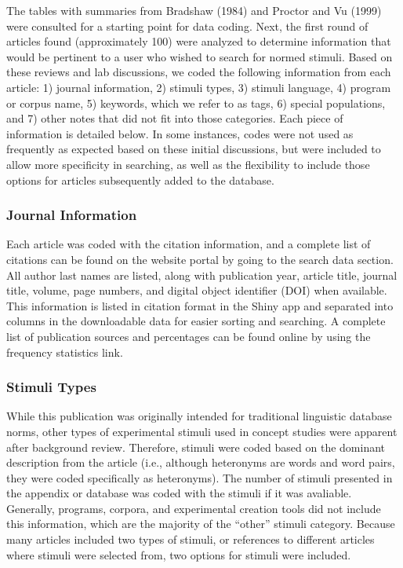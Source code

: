 \documentclass[english,,man]{apa6}
\theoremstyle{definition}
\theoremstyle{definition}
\theoremstyle{definition}
\theoremstyle{remark}
\begin{document}
The tables with summaries from Bradshaw (1984) and Proctor and Vu (1999)
were consulted for a starting point for data coding. Next, the first
round of articles found (approximately 100) were analyzed to determine
information that would be pertinent to a user who wished to search for
normed stimuli. Based on these reviews and lab discussions, we coded the
following information from each article: 1) journal information, 2)
stimuli types, 3) stimuli language, 4) program or corpus name, 5)
keywords, which we refer to as tags, 6) special populations, and 7)
other notes that did not fit into those categories. Each piece of
information is detailed below. In some instances, codes were not used as
frequently as expected based on these initial discussions, but were
included to allow more specificity in searching, as well as the
flexibility to include those options for articles subsequently added to
the database.

\hypertarget{journal-information}{%
\subsubsection{Journal Information}\label{journal-information}}

Each article was coded with the citation information, and a complete
list of citations can be found on the website portal by going to the
search data section. All author last names are listed, along with
publication year, article title, journal title, volume, page numbers,
and digital object identifier (DOI) when available. This information is
listed in citation format in the Shiny app and separated into columns in
the downloadable data for easier sorting and searching. A complete list
of publication sources and percentages can be found online by using the
frequency statistics link.

\hypertarget{stimuli-types}{%
\subsubsection{Stimuli Types}\label{stimuli-types}}

While this publication was originally intended for traditional
linguistic database norms, other types of experimental stimuli used in
concept studies were apparent after background review. Therefore,
stimuli were coded based on the dominant description from the article
(i.e., although heteronyms are words and word pairs, they were coded
specifically as heteronyms). The number of stimuli presented in the
appendix or database was coded with the stimuli if it was avaliable.
Generally, programs, corpora, and experimental creation tools did not
include this information, which are the majority of the \enquote{other}
stimuli category. Because many articles included two types of stimuli,
or references to different articles where stimuli were selected from,
two options for stimuli were included.
\end{document}
